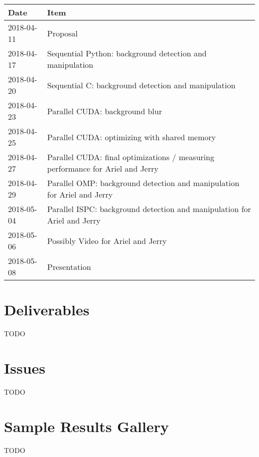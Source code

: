\documentclass[12pt]{article}
\begin{document}
\begin{tabular}{l|l}
    Date & Item \\
    \hline
    2018-04-11 & Proposal \\
    2018-04-17 & Sequential Python: background detection and manipulation \\
    2018-04-20 & Sequential C: background detection and manipulation \\
    2018-04-23 & Parallel CUDA: background blur\\
    2018-04-25 & Parallel CUDA: optimizing with shared memory\\
    2018-04-27 & Parallel CUDA: final optimizations / measuring performance
                 for Ariel and Jerry\\
    2018-04-29 & Parallel OMP: background detection and manipulation
                 for Ariel and Jerry\\
    2018-05-04 & Parallel ISPC: background detection and manipulation
                 for Ariel and Jerry\\
    2018-05-06 & Possibly Video for Ariel and Jerry\\
    2018-05-08 & Presentation
\end{tabular}

\section{Deliverables}

TODO

\section{Issues}

TODO

\section{Sample Results Gallery}

TODO
\end{document}
